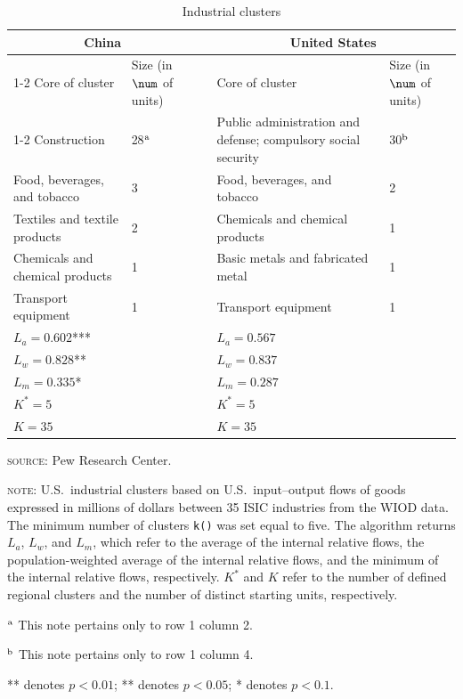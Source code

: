 \begin{table}[h!]
\begin{threeparttable}
\centering
\caption{Industrial clusters}
\label{Table4}
\begin{tabularx}{\textwidth}{X  p{1.5cm}  p{1pt}  X  p{1.5cm}}
\hline
\multicolumn{2}{c}{China} & & \multicolumn{2}{c}{United States} \\
\cline{1-2} \cline{4-5}
Core of cluster & Size (in $\num$ of units) & & Core of cluster & Size (in $\num$ of units) \\
\cline{1-2} \cline{4-5}
Construction & 28$^{\rm a}$ & & Public administration and defense; compulsory social
security & 30$^{\rm b}$ \\
Food, beverages, and tobacco & 3 & & Food, beverages, and tobacco & 2 \\
Textiles and textile products & 2 & & Chemicals and chemical products & 1 \\
Chemicals and chemical products & 1 & & Basic metals and fabricated metal & 1 \\
Transport equipment & 1 & & Transport equipment & 1 \\
\hline
\multicolumn{2}{l}{$L_a=0.602$***} & & \multicolumn{2}{l}{$L_a=0.567$} \\
\multicolumn{2}{l}{$L_w=0.828$**} & & \multicolumn{2}{l}{$L_w=0.837$} \\
\multicolumn{2}{l}{$L_m=0.335$*} & & \multicolumn{2}{l}{$L_m=0.287$} \\
\multicolumn{2}{l}{$K^*=5$} & & \multicolumn{2}{l}{$K^*=5$} \\
\multicolumn{2}{l}{$K=35$} & & \multicolumn{2}{l}{$K=35$} \\
\hline
\end{tabularx}
\begin{tablenotes}
\footnotesize
\item \textsc{source:} Pew Research Center.
\item \textsc{note:} U.S.~industrial clusters based on
U.S.~input--output flows of goods expressed in millions of dollars between 35
{\smrm ISIC} industries from the {\smrm WIOD} data. The minimum number of
clusters \texttt{k()} was set equal to five. The algorithm returns $L_a$,
$L_w$, and $L_m$, which refer to the average of the internal relative
flows, the population-weighted average of the internal relative
flows, and the minimum of the internal relative flows,
respectively. $K^*$ and $K$ refer to the number of defined regional clusters
and the number of distinct starting units, respectively.
\item $^{\rm a}$ This note pertains only to row 1 column 2.
\item $^{\rm b}$ This note pertains only to row 1 column 4.
\item *** denotes $p<0.01$; ** denotes $p<0.05$; * denotes $p<0.1$.
\end{tablenotes}
\end{threeparttable}
\end{table}

